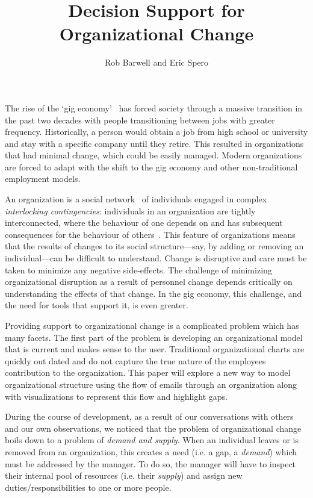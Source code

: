 \documentclass[journal]{vgtc}                %
\title{Decision Support for Organizational Change}
\author{Rob Barwell and Eric Spero}
\begin{document}

\maketitle


The rise of the \lq gig economy\rq{}~\cite{de2015rise,friedman2014workers} has forced society through a massive transition in the past two decades with people transitioning between jobs with greater frequency.  Historically, a person would obtain a job from high school or university and stay with a specific company until they retire.  This resulted in organizations that had minimal change, which could be easily managed. Modern organizations are forced to adapt with the shift to the gig economy and other non-traditional employment models.  

An organization is a social network~\cite{scott1988social} of individuals engaged in complex \emph{interlocking contingencies}: individuals in an organization are tightly interconnected, where the behaviour of one depends on and has subsequent consequences for the behaviour of others~\cite{glenn2006complexity}. This feature of organizations means that the results of changes to its social structure---say, by adding or removing an individual---can be difficult to understand. Change is disruptive and care must be taken to minimize any negative side-effects. The challenge of minimizing organizational disruption as a result of personnel change depends critically on understanding the effects of that change. In the gig economy, this challenge, and the need for tools that support it, is even greater.

Providing support to organizational change is a complicated problem which has many facets.  The first part of the problem is developing an organizational model that is current and makes sense to the user.  Traditional organizational charts are quickly out dated and do not capture the true nature of the employees contribution to the organization.  This paper will explore a new way to model organizational structure using the flow of emails through an organization along with visualizations to represent this flow and highlight gaps.

During the course of development, as a result of our conversations with others and our own observations, we noticed that the problem of organizational change boils down to a problem of \emph{demand and supply}. When an individual leaves or is removed from an organization, this creates a need (i.e. a gap, a \emph{demand}) which must be addressed by the manager. To do so, the manager will have to inspect their internal pool of resources (i.e. their \emph{supply}) and assign new duties/responsibilities to one or more people.
\end{document}
